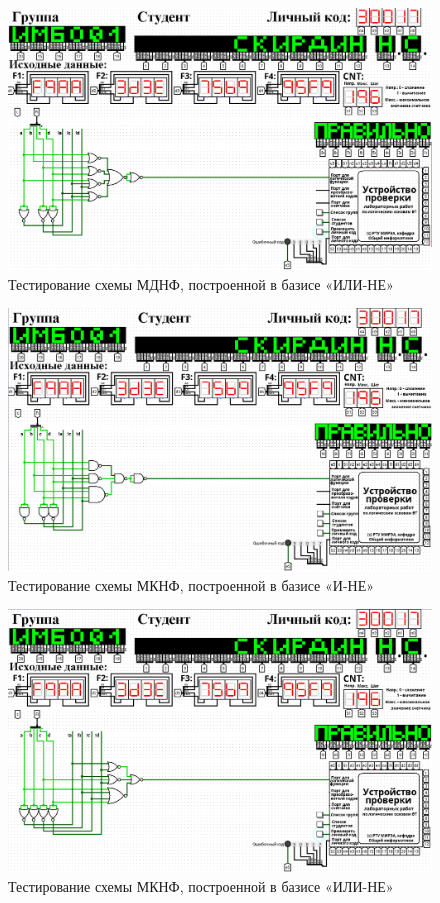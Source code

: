 \documentclass[14pt, a4paper]{extreport}
\begin{document}
\begin{figure}[H]
	\centering
	\caption{Тестирование схемы МДНФ, построенной в базисе «ИЛИ-НЕ»}
	\label{fig:mdnf-or-not}
	\includegraphics[width=\textwidth]{mdnf-or-not}
\end{figure}

\begin{figure}[H]
	\centering
	\caption{Тестирование схемы МКНФ, построенной в базисе «И-НЕ»}
	\label{fig:mknf-and-not}
	\includegraphics[width=\textwidth]{mknf-and-not}
\end{figure}

\begin{figure}[H]
	\centering
	\caption{Тестирование схемы МКНФ, построенной в базисе «ИЛИ-НЕ»}
	\label{fig:mknf-or-not}
	\includegraphics[width=\textwidth]{mknf-or-not}
\end{figure}
\end{document}
